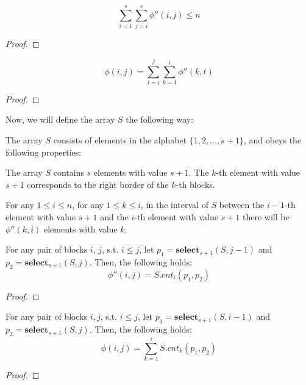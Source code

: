 \documentclass[runningheads]{llncs}
\begin{document}
\begin{theorem}
    \[
        \sum_{i=1}^{s}\sum_{j=i}^{s} \phi''(i,j) \leq n
    \]
\end{theorem}
\begin{proof}
    
\end{proof}


\begin{theorem}
    \[
        \phi(i,j) = \sum_{t=i}^{j} \sum_{k=1}^{i} \phi''(k,t)
    \]
\end{theorem}
\begin{proof}
    
\end{proof}

Now, we  will define the array $S$ the following way:
\begin{definition}
    The array $S$ consists of elements in the alphabet $\{1,2,\dots,s+1\}$, 
    and obeys the following properties:
    
    \begin{property}
        The array $S$ contains $s$ elements with value $s+1$. 
        The $k$-th element with value $s+1$ corresponds to the right border of the $k$-th blocks.  
    \end{property}
    
    \begin{property}
        For any $1\leq i\leq n$, for any $1 \leq k \leq i$, 
        in the interval of $S$ between the $i-1$-th element with value $s+1$ 
        and the $i$-th element with value $s+1$ there will be $\phi''(k,i)$ elements with value $k$. 
    \end{property}

\end{definition}

\begin{lemma}
    For any pair of blocks $i$, $j$, s.t. $i\leq j$, 
    let $p_1=\textbf{select}_{s+1}(S, j-1)$ and $p_2=\textbf{select}_{s+1}(S, j)$. 
    Then, the following holds:
    \[
        \phi''(i,j)=S.cnt_{i}(p_1, p_2)
    \]
\end{lemma}
\begin{proof}
    
\end{proof}


\begin{lemma}
    For any pair of blocks $i,j$, s.t. $i\leq j$,
    let $p_1=\textbf{select}_{s+1}(S, i-1)$ and  $p_2=\textbf{select}_{s+1}(S,j)$.
    Then, the following holds:
    \[
        \phi(i,j) = \sum_{k=1}^{i}S.cnt_{k}(p_1, p_2)
    \]  
\end{lemma}
\begin{proof}
    
\end{proof}
\end{document}
